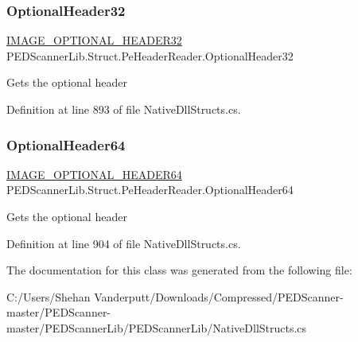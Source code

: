 \subsubsection{\texorpdfstring{Optional\+Header32}{OptionalHeader32}}
{\footnotesize\ttfamily \mbox{\hyperlink{struct_p_e_d_scanner_lib_1_1_struct_1_1_pe_header_reader_1_1_i_m_a_g_e___o_p_t_i_o_n_a_l___h_e_a_d_e_r32}{I\+M\+A\+G\+E\+\_\+\+O\+P\+T\+I\+O\+N\+A\+L\+\_\+\+H\+E\+A\+D\+E\+R32}} P\+E\+D\+Scanner\+Lib.\+Struct.\+Pe\+Header\+Reader.\+Optional\+Header32\hspace{0.3cm}{\ttfamily [get]}}



Gets the optional header 



Definition at line 893 of file Native\+Dll\+Structs.\+cs.

\mbox{\label{class_p_e_d_scanner_lib_1_1_struct_1_1_pe_header_reader_a59db8bf8f6afa28f5fa3f337b13fa1a0}} 
\subsubsection{\texorpdfstring{Optional\+Header64}{OptionalHeader64}}
{\footnotesize\ttfamily \mbox{\hyperlink{struct_p_e_d_scanner_lib_1_1_struct_1_1_pe_header_reader_1_1_i_m_a_g_e___o_p_t_i_o_n_a_l___h_e_a_d_e_r64}{I\+M\+A\+G\+E\+\_\+\+O\+P\+T\+I\+O\+N\+A\+L\+\_\+\+H\+E\+A\+D\+E\+R64}} P\+E\+D\+Scanner\+Lib.\+Struct.\+Pe\+Header\+Reader.\+Optional\+Header64\hspace{0.3cm}{\ttfamily [get]}}



Gets the optional header 



Definition at line 904 of file Native\+Dll\+Structs.\+cs.



The documentation for this class was generated from the following file\+:\begin{DoxyCompactItemize}
\item 
C\+:/\+Users/\+Shehan Vanderputt/\+Downloads/\+Compressed/\+P\+E\+D\+Scanner-\/master/\+P\+E\+D\+Scanner-\/master/\+P\+E\+D\+Scanner\+Lib/\+P\+E\+D\+Scanner\+Lib/Native\+Dll\+Structs.\+cs\end{DoxyCompactItemize}
